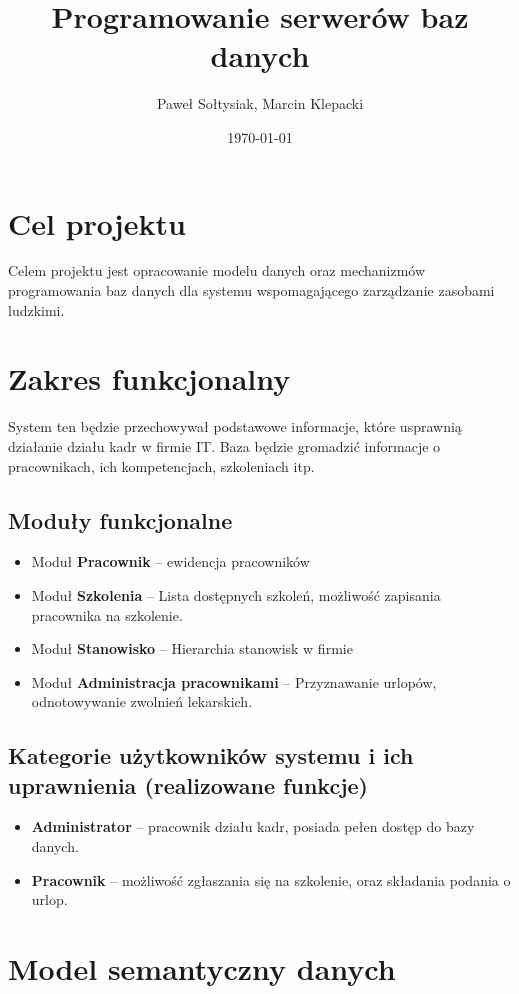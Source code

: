 \documentclass[a4paper]{article}
\title{Programowanie serwerów baz danych}
\author{Paweł Sołtysiak, Marcin Klepacki}
\date{\today}
\begin{document}


\section{Cel projektu}
Celem projektu jest opracowanie modelu danych oraz mechanizmów programowania baz danych dla systemu wspomagającego zarządzanie zasobami ludzkimi.
\section{Zakres funkcjonalny}
System ten będzie przechowywał podstawowe informacje, które usprawnią działanie działu kadr w firmie IT. Baza będzie gromadzić informacje o pracownikach, ich kompetencjach, szkoleniach itp.
\subsection{Moduły funkcjonalne}
\begin{itemize}
\item Moduł \textbf{Pracownik} -- ewidencja pracowników
\item Moduł \textbf{Szkolenia} -- Lista dostępnych szkoleń, możliwość zapisania pracownika na szkolenie.
\item Moduł \textbf{Stanowisko} -- Hierarchia stanowisk w firmie
\item Moduł \textbf{Administracja pracownikami} -- Przyznawanie urlopów, odnotowywanie zwolnień lekarskich.
\end{itemize}
\subsection{Kategorie użytkowników systemu i ich uprawnienia (realizowane funkcje)}
\begin{itemize}
\item \textbf{Administrator} -- pracownik działu kadr, posiada pełen dostęp do bazy danych.
\item \textbf{Pracownik} -- możliwość zgłaszania się na szkolenie, oraz składania podania o urlop.

\end{itemize}
\section{Model semantyczny danych}
\end{document}
